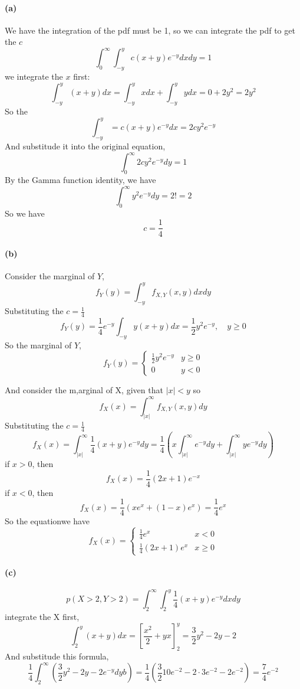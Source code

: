 \documentclass[a4paper,10pt]{article}
\begin{document}
\paragraph{(a)}
We have the integration of the pdf must be 1, so we can integrate the pdf to get the $c$
\[
\int_{0}^{\infty} \int_{-y}^{y} c(x+y)e^{-y} dx dy = 1
\]
we integrate the $x$ first:
\[
\int_{-y}^{y}(x + y) dx = \int_{-y}^{y} x dx + \int_{-y}^{y} y dx = 0 + 2y^2 = 2y^2
\]
So the 
\[
\int_{-y}^{y} = c(x + y)e^{-y}dx = 2cy^2e^{-y}
\]
And substitude it into the original equation,
\[
\int_{0}^{\infty}2cy^2e^{-y}dy = 1
\]
By the Gamma function identity, we have
\[
\int_{0}^{\infty}y^2e^{-y}dy = 2! = 2
\]
So we have
\[
\boxed{c = \frac{1}{4}}
\]

\paragraph{(b)}
Consider the marginal of $Y$,
\[
f_Y(y) = \int_{-y}^{y}f_{X,Y}(x,y)dxdy
\]
Substituting the \(c = \frac{1}{4}\)
\[
f_Y(y) = \frac{1}{4}e^{-y}\int_{-y}{y}(x+y)dx = \frac{1}{2}y^2e^{-y}, \quad y \ge 0
\]
So the marginal of $Y$,
\[\boxed{
f_Y(y) =
\begin{cases}
\frac{1}{2}y^2e^{-y} & y \ge 0\\
0 & y < 0
\end{cases}}
\]

And consider the m,arginal of X, given that \(|x| < y\)
so
\[
f_X(x) = \int_{|x|}^{\infty}f_{X,Y}(x,y)dy
\]
Substituting the \(c = \frac{1}{4}\)
\[
f_X(x) = \int_{|x|}^{\infty} \frac{1}{4}(x+y)e^{-y}dy = \frac{1}{4} \left(x\int_{|x|}^{\infty}e^{-y}dy + \int_{|x|}^{\infty}ye^{-y}dy\right)
\]
if \(x > 0\), then
\[
f_X(x) = \frac{1}{4}(2x+1)e^{-x}
\]
if \(x < 0\), then
\[
f_X(x)= \frac{1}{4}\left(xe^x + (1-x)e^x \right)= \frac{1}{4}e^x
\]
So the equationwe have
\[\boxed{
f_X(x) = 
\begin{cases}
\frac{1}{4}e^x & x < 0\\
\frac{1}{4}(2x+1)e^x & x \ge 0
\end{cases}
}
\]
\paragraph{(c)}
\[
p(X > 2, Y > 2) = \int_{2}^{\infty}\int_{2}^{y}\frac{1}{4}(x + y)e^{-y}dxdy
\]
integrate the X first,
\[
\int_{2}^{y}(x + y) dx = \left[\frac{x^2}{2} + yx\right]_{2}^{y} = \frac{3}{2}y^2 -2y -2
\]
And substitude this formula, 
\[
\frac{1}{4} \int_{2}^{\infty} \left(\frac{3}{2}y^2 - 2y -2e^{-y}dyb\right) = \frac{1}{4}\left(\frac{3}{2}10e^{-2} - 2\cdot 3e^{-2} - 2e^{-2}\right) = \boxed{\frac{7}{4}e^{-2}}
\]
\end{document}

